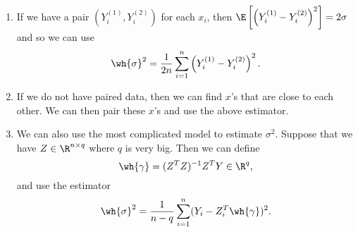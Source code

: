 \begin{enumerate}
    \item If we have a pair $\left(Y_i^{(1)}, Y_i^{(2)}\right)$ for each $x_i$, then $\E\left[\left(Y_i^{(1)}-Y_i^{(2)}\right)^2\right] =2\sigma$ and so we can use
    \[\wh{\sigma}^2 = \frac{1}{2n}\sum_{i=1}^n \left(Y_i^{(1)}-Y_i^{(2)}\right)^2. \]
    \item If we do not have paired data, then we can find $x$'s that are close to each other. We can then pair these $x$'s and use the above estimator.
    \item We can also use the most complicated model to estimate $\sigma^2$. Suppose that we have $Z \in \R^{n \times q}$ where $q$ is very big. Then we can define 
    \[\wh{\gamma} = (Z^TZ)^{-1}Z^TY \in \R^q, \]
    and use the estimator
    \[\wh{\sigma}^2 = \frac{1}{n-q} \sum_{i=1}^n (Y_i-Z_i^T\wh{\gamma})^2.\]  
\end{enumerate}
